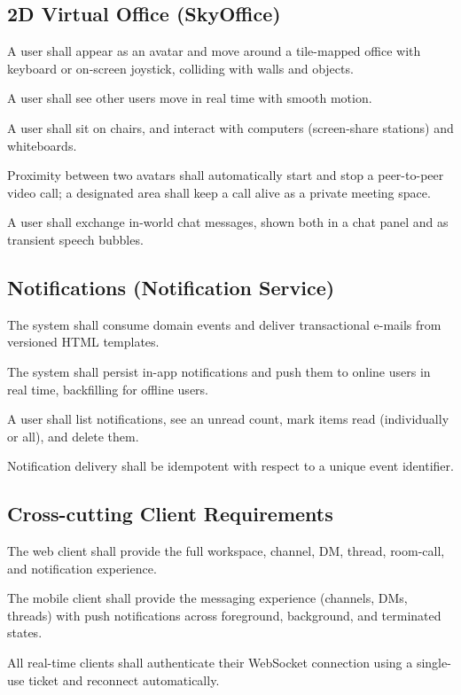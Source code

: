 \subsection{2D Virtual Office (SkyOffice)}
\begin{description}[leftmargin=1.6cm,style=nextline]
  \item[FR-29] A user shall appear as an avatar and move around a tile-mapped
  office with keyboard or on-screen joystick, colliding with walls and objects.
  \item[FR-30] A user shall see other users move in real time with smooth motion.
  \item[FR-31] A user shall sit on chairs, and interact with computers
  (screen-share stations) and whiteboards.
  \item[FR-32] Proximity between two avatars shall automatically start and stop a
  peer-to-peer video call; a designated area shall keep a call alive as a private
  meeting space.
  \item[FR-33] A user shall exchange in-world chat messages, shown both in a chat
  panel and as transient speech bubbles.
\end{description}

\subsection{Notifications (Notification Service)}
\begin{description}[leftmargin=1.6cm,style=nextline]
  \item[FR-34] The system shall consume domain events and deliver transactional
  e-mails from versioned HTML templates.
  \item[FR-35] The system shall persist in-app notifications and push them to
  online users in real time, backfilling for offline users.
  \item[FR-36] A user shall list notifications, see an unread count, mark items
  read (individually or all), and delete them.
  \item[FR-37] Notification delivery shall be idempotent with respect to a unique
  event identifier.
\end{description}

\subsection{Cross-cutting Client Requirements}
\begin{description}[leftmargin=1.6cm,style=nextline]
  \item[FR-38] The web client shall provide the full workspace, channel, DM,
  thread, room-call, and notification experience.
  \item[FR-39] The mobile client shall provide the messaging experience (channels,
  DMs, threads) with push notifications across foreground, background, and
  terminated states.
  \item[FR-40] All real-time clients shall authenticate their WebSocket
  connection using a single-use ticket and reconnect automatically.
\end{description}

